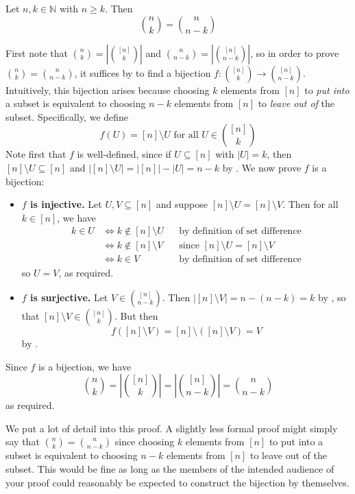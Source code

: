 \begin{proposition}
\label{propBinomialSymmetry}
Let $n,k \in \mathbb{N}$ with $n \ge k$. Then \[ \binom{n}{k} = \binom{n}{n-k} \]
\end{proposition}
\begin{cproof}
First note that $\binom{n}{k} = \left| \binom{[n]}{k} \right|$ and $\binom{n}{n-k} = \left| \binom{[n]}{n-k} \right|$, so in order to prove $\binom{n}{k} = \binom{n}{n-k}$, it suffices by  to find a bijection $f : \binom{[n]}{k} \to \binom{[n]}{n-k}$.
Intuitively, this bijection arises because choosing $k$ elements from $[n]$ to \textit{put into} a subset is equivalent to choosing $n-k$ elements from $[n]$ to \textit{leave out of} the subset. Specifically, we define
\[ f(U) = [n] \setminus U \text{ for all } U \in \binom{[n]}{k} \]
Note first that $f$ is well-defined, since if $U \subseteq [n]$ with $|U|=k$, then $[n] \setminus U \subseteq [n]$ and $|[n] \setminus U| = |[n]|-|U| = n-k$ by . We now prove $f$ is a bijection:
\begin{itemize}
\item \textbf{$f$ is injective.} Let $U, V \subseteq [n]$ and suppose $[n] \setminus U = [n] \setminus V$. Then for all $k \in [n]$, we have
\begin{align*}
k \in U &\Leftrightarrow k \not \in [n] \setminus U && \text{by definition of set difference} \\
&\Leftrightarrow k \not \in [n] \setminus V && \text{since $[n] \setminus U = [n] \setminus V$} \\
&\Leftrightarrow k \in V && \text{by definition of set difference}
\end{align*}
so $U=V$, as required.
\item \textbf{$f$ is surjective.} Let $V \in \binom{[n]}{n-k}$. Then $|[n] \setminus V| = n-(n-k) = k$ by , so that $[n] \setminus V \in \binom{[n]}{k}$. But then
\[ f([n] \setminus V) = [n] \setminus ([n] \setminus V) = V \]
by .
\end{itemize}
Since $f$ is a bijection, we have
\[ \binom{n}{k} = \left| \binom{[n]}{k} \right| = \left| \binom{[n]}{n-k} \right| = \binom{n}{n-k} \]
as required.
\end{cproof}

We put a lot of detail into this proof. A slightly less formal proof might simply say that $\binom{n}{k} = \binom{n}{n-k}$ since choosing $k$ elements from $[n]$ to put into a subset is equivalent to choosing $n-k$ elements from $[n]$ to leave out of the subset. This would be fine as long as the members of the intended audience of your proof could reasonably be expected to construct the bijection by themselves.

